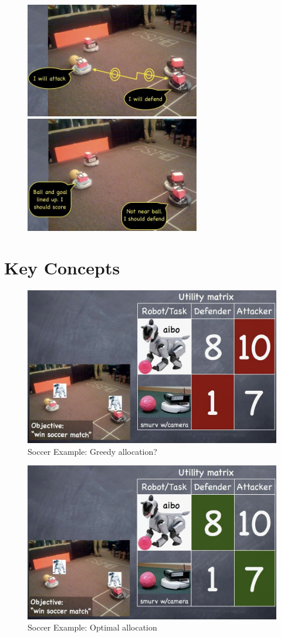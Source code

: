 \begin{figure}
\centerline{
\mbox{\includegraphics[width=3.00in]{figures/10_coordination1.jpg}}
\mbox{\includegraphics[width=3.00in]{figures/10_coordination2.jpg}}
}
\end{figure}

\section{Key Concepts}

\begin{figure}[!h]
\centering
\includegraphics[width=0.8\columnwidth]{figures/10_soccer_example1.jpg}
\caption{Soccer Example: Greedy allocation?}
\end{figure}

\begin{figure}[!h]
\centering
\includegraphics[width=0.8\columnwidth]{figures/10_soccer_example2.jpg}
\caption{Soccer Example: Optimal allocation}
\end{figure}


